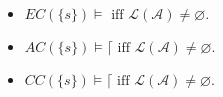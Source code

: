 \begin{theorem}
  \begin{itemize}
  \item \(EC(\{s\}) \models \text{ iff }
    \mathcal{L}(\mathcal{A}) \neq \varnothing. \)
  \item \(AC(\{s\}) \models \lceil \text{ iff }
    \mathcal{L}(\mathcal{A}) \neq \varnothing. \)
  \item \(CC(\{s\}) \models \lceil \text{ iff }
    \mathcal{L}(\mathcal{A}) \neq \varnothing. \)
\end{itemize}
\end{theorem}
